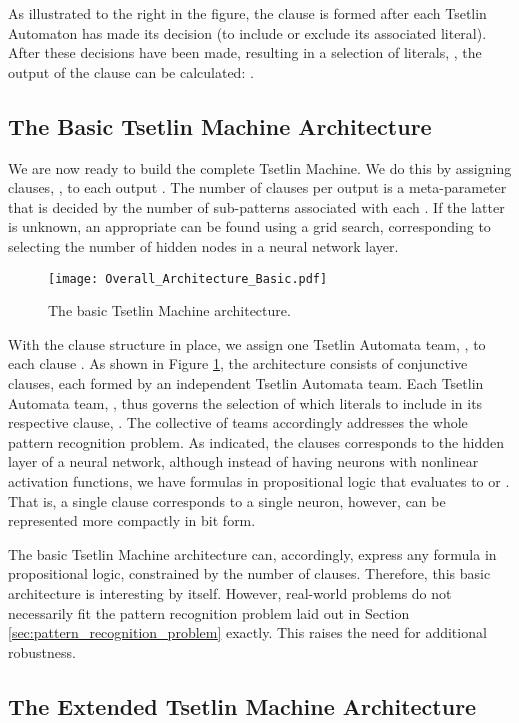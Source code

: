 \documentclass[11pt,a4paper]{article}
\begin{document}
As illustrated to the right in the figure, the clause is formed after each Tsetlin Automaton has made its decision (to include or exclude its associated literal). After these decisions have been made, resulting in a selection of literals, , the output of the clause can be calculated: .

\subsection{The Basic Tsetlin Machine Architecture}
We are now ready to build the complete Tsetlin Machine. We do this by assigning  clauses,  , to each output . The number of clauses  per output  is a meta-parameter that is decided by the number of sub-patterns associated with each . If the latter is unknown, an appropriate  can be found using a grid search, corresponding to selecting the number of hidden nodes in a neural network layer.

\begin{figure}[!t]
\centering
\texttt{[image: Overall\_Architecture\_Basic.pdf]}
\caption{The basic Tsetlin Machine architecture.}
\label{figure:architecture_basic}
\end{figure}

With the clause structure in place, we assign one Tsetlin Automata team,  , to each clause . As shown in Figure \ref{figure:architecture_basic}, the architecture consists of  conjunctive clauses, each formed by an independent Tsetlin Automata team. Each Tsetlin Automata team, , thus governs the selection of which literals to include in its respective clause, . The collective of teams accordingly addresses the whole pattern recognition problem. As indicated, the clauses corresponds to the hidden layer of a neural network, although instead of having neurons with nonlinear activation functions, we have formulas in propositional logic that evaluates to  or . That is, a single clause corresponds to a single neuron, however, can be represented more compactly in bit form.  

The basic Tsetlin Machine architecture can, accordingly, express any formula in propositional logic, constrained by the number of clauses. Therefore, this basic architecture is interesting by itself. However, real-world problems do not necessarily fit the pattern recognition problem laid out in Section \ref{sec:pattern_recognition_problem} exactly. This raises the need for additional robustness.

\subsection{The Extended Tsetlin Machine Architecture}
\end{document}
